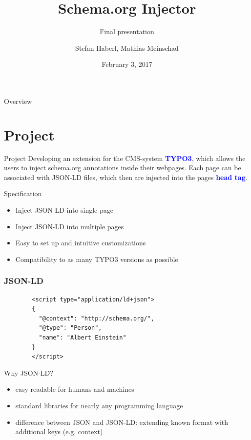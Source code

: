 \documentclass{beamer}
\title{Schema.org Injector}
\subtitle{Final presentation}
\author{Stefan Haberl, Mathias Meinschad}
\institute{STI Innsbruck}
\date{February 3, 2017}
\begin{document}
\begin{frame}
  \titlepage
\end{frame}

\begin{frame}{Overview}
  \tableofcontents
\end{frame}

\section{Project}
\begin{frame}{Project}
	Developing an extension for the CMS-system \textcolor{blue}{\textbf{TYPO3}}, which allows the users to inject schema.org annotations inside their webpages.
	Each page can be associated with JSON-LD files, which then are injected into the pages \textcolor{blue}{\textbf{head tag}}. 
	
	\begin{block}{Specification}
		\begin{itemize}
			\item Inject JSON-LD into single page
			\item Inject JSON-LD into multiple pages
			\item Easy to set up and intuitive customizations
			\item Compatibility to as many TYPO3 versions as possible
		\end{itemize}
	\end{block}
\end{frame}

\begin{frame}[fragile]
\frametitle{JSON-LD}
\begin{block}{}
	\begin{lstlisting}
		<script type="application/ld+json">
		{
		  "@context": "http://schema.org/",
		  "@type": "Person",
		  "name": "Albert Einstein"
		}
		</script>
	\end{lstlisting}
\end{block}

\begin{block}{Why JSON-LD?}
	\begin{itemize}
	\item easy readable for humans and machines
	\item standard libraries for nearly any programming language
	\item difference between JSON and JSON-LD: extending known format with additional keys (e.g. context)
	\end{itemize}
\end{block}

\end{frame}
\end{document}
